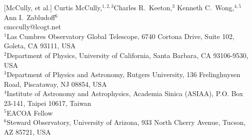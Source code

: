 [McCully, et al.]
  {Curtis McCully,$^{1, 2, 3}$\footnotemark[1]
  Charles R.\ Keeton,$^3$
  Kenneth C.\ Wong,$^{4, 5}$
  Ann I.\ Zabludoff$^6$\\
  \footnotemark[1]cmccully@lcogt.net\\
  $^1$Las Cumbres Observatory Global Telescope, 6740 Cortona Drive, Suite 102, Goleta, CA 93111, USA\\
  $^2$Department of Physics, University of California, Santa Barbara,
CA 93106-9530, USA\\
  $^3$Department of Physics and Astronomy, Rutgers University, 136 Frelinghuysen Road, Piscataway, NJ 08854, USA\\
  $^4$Institute of Astronomy and Astrophysics, Academia Sinica (ASIAA), P.O. Box 23-141, Taipei 10617, Taiwan\\
  $^5$EACOA Fellow\\
    $^6$Steward Observatory, University of Arizona, 933 North Cherry Avenue, Tucson, AZ 85721, USA\\}
\maketitle